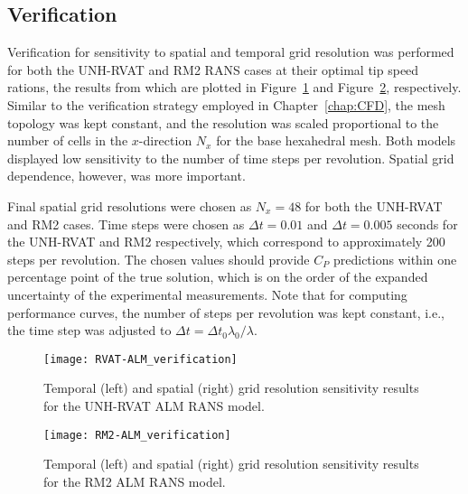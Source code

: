 \subsection{Verification}

Verification for sensitivity to spatial and temporal grid resolution was
performed for both the UNH-RVAT and RM2 RANS cases at their optimal tip speed
rations, the results from which are plotted in
Figure~\ref{fig:RVAT-ALM-verification} and
Figure~\ref{fig:RM2-ALM-verification}, respectively. Similar to the verification
strategy employed in Chapter~\ref{chap:CFD}, the mesh topology was kept
constant, and the resolution was scaled proportional to the number of cells in
the $x$-direction $N_x$ for the base hexahedral mesh. Both models displayed low
sensitivity to the number of time steps per revolution. Spatial grid dependence,
however, was more important.

Final spatial grid resolutions were chosen as $N_x=48$ for both the UNH-RVAT and
RM2 cases. Time steps were chosen as $\Delta t = 0.01$ and $\Delta t = 0.005$
seconds for the UNH-RVAT and RM2 respectively, which correspond to approximately
200 steps per revolution. The chosen values should provide $C_P$ predictions
within one percentage point of the true solution, which is on the order of the
expanded uncertainty of the experimental measurements. Note that for computing
performance curves, the number of steps per revolution was kept constant, i.e.,
the time step was adjusted to $\Delta t = \Delta t_0 \lambda_0 / \lambda$.

\begin{figure}
    \centering

    \texttt{[image: RVAT-ALM\_verification]}

    \caption{Temporal (left) and spatial (right) grid resolution sensitivity
        results for the UNH-RVAT ALM RANS model.}

    \label{fig:RVAT-ALM-verification}
\end{figure}

\begin{figure}
    \centering

    \texttt{[image: RM2-ALM\_verification]}

    \caption{Temporal (left) and spatial (right) grid resolution sensitivity
        results for the RM2 ALM RANS model.}

    \label{fig:RM2-ALM-verification}
\end{figure}



